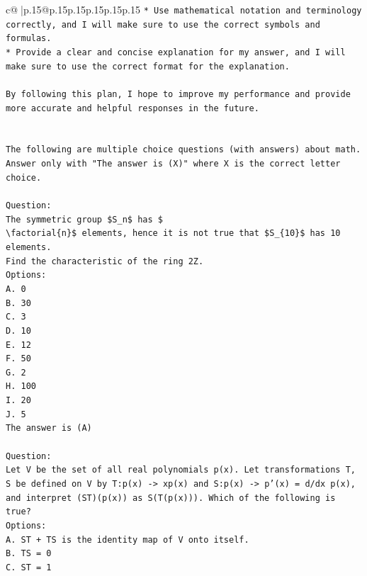 \documentclass{article}
\begin{document}
{\begin{supertabular}{c@{$\;$}|p{.15\linewidth}@{}p{.15\linewidth}p{.15\linewidth}p{.15\linewidth}p{.15\linewidth}p{.15\linewidth}}
{{{\texttt{* Use mathematical notation and terminology correctly, and I will make sure to use the correct symbols and formulas.} \\
\texttt{* Provide a clear and concise explanation for my answer, and I will make sure to use the correct format for the explanation.} \\
\\ 
\texttt{By following this plan, I hope to improve my performance and provide more accurate and helpful responses in the future.} \\
\\ 
\\ 
\texttt{The following are multiple choice questions (with answers) about math. Answer only with "The answer is (X)" where X is the correct letter choice.} \\
\\ 
\texttt{Question:} \\
\texttt{The symmetric group \$S\_n\$ has \$} \\
\texttt{\textbackslash{}factorial\{n\}\$ elements, hence it is not true that \$S\_\{10\}\$ has 10 elements.} \\
\texttt{Find the characteristic of the ring 2Z.} \\
\texttt{Options:} \\
\texttt{A. 0} \\
\texttt{B. 30} \\
\texttt{C. 3} \\
\texttt{D. 10} \\
\texttt{E. 12} \\
\texttt{F. 50} \\
\texttt{G. 2} \\
\texttt{H. 100} \\
\texttt{I. 20} \\
\texttt{J. 5} \\
\texttt{The answer is (A)} \\
\\ 
\texttt{Question:} \\
\texttt{Let V be the set of all real polynomials p(x). Let transformations T, S be defined on V by T:p(x) {-}> xp(x) and S:p(x) {-}> p'(x) = d/dx p(x), and interpret (ST)(p(x)) as S(T(p(x))). Which of the following is true?} \\
\texttt{Options:} \\
\texttt{A. ST + TS is the identity map of V onto itself.} \\
\texttt{B. TS = 0} \\
\texttt{C. ST = 1} \\
}}}
\end{supertabular}}
\end{document}
